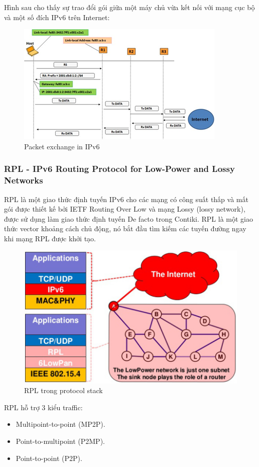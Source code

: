 \documentclass{report}
\begin{document}
Hình sau cho thấy sự trao đổi gói giữa một máy chủ vừa kết nối với mạng cục bộ và một số đích IPv6 trên Internet:
\begin{figure}[h]
	\centering
	\includegraphics[scale = 0.7]{fig24.png}
	\caption{Packet exchange in IPv6}
	\label{fig:Graph24}
\end{figure}

\subsubsection{RPL - IPv6 Routing Protocol for Low-Power and Lossy Networks}
RPL là một giao thức định tuyến IPv6 cho các mạng có công suất thấp và mất gói được
thiết kế bởi IETF Routing Over Low và mạng Lossy (lossy network), được sử dụng làm giao
thức định tuyến De facto trong Contiki. RPL là một giao thức vector khoảng cách chủ động,
nó bắt đầu tìm kiếm các tuyến đường ngay khi mạng RPL được khởi tạo.
\begin{figure}[h]
	\centering
	\includegraphics[scale = 0.7]{fig16.png}
	\caption{RPL trong protocol stack}
	\label{fig:Graph16}
\end{figure}

RPL hỗ trợ 3 kiểu traffic:
\begin{itemize}
\item Multipoint-to-point (MP2P).
\item Point-to-multipoint (P2MP).
\item Point-to-point (P2P). 
\end{itemize}
\end{document}
